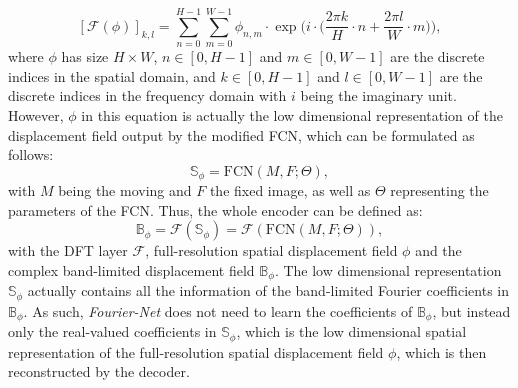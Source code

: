 \begin{equation} \label{eq:DFT}
	[\mathcal{F}(\phi)]_{k,l} = \sum^{H-1}_{n=0} \sum^{W-1}_{m=0} \phi_{n,m} \cdot \exp \Bigg(i \cdot \bigg(\frac{2 \pi k}{H} \cdot n + \frac{2 \pi l}{W} \cdot m \bigg) \Big),
\end{equation}
where $\phi$ has size $H \times W$, $n \in [0,H-1]$ and $m \in [0,W-1]$ are the discrete indices in the spatial domain, and $k \in [0,H-1]$ and $l \in [0,W-1]$ are the discrete indices in the frequency domain with $i$ being the imaginary unit. However, $\phi$ in this equation is actually the low dimensional representation of the displacement field output by the modified FCN, which can be formulated as follows:
\begin{equation} \label{eq:FCN}
	\mathbb{S}_\phi = \text{FCN}(M,F;\Theta),
\end{equation}
with $M$ being the moving and $F$ the fixed image, as well as $\Theta$ representing the parameters of the FCN. Thus, the whole encoder can be defined 
as:
\begin{equation}\label{eq:encoder}
	\mathbb{B}_\phi = \mathcal{F}(\mathbb{S}_\phi) = \mathcal{F}(\text{FCN}(M,F;\Theta)),
\end{equation}
with the DFT layer $\mathcal{F}$, full-resolution spatial displacement field $\phi$ and the complex band-limited displacement field $\mathbb{B}_\phi$. The low dimensional representation $\mathbb{S}_\phi$ actually contains all the information of the band-limited Fourier coefficients in $\mathbb{B}_\phi$. As such, \emph{Fourier-Net} does not need to learn the coefficients of $\mathbb{B}_\phi$, but instead only the real-valued coefficients in $\mathbb{S}_\phi$, which is the low dimensional spatial representation of the full-resolution spatial displacement field $\phi$, which is then reconstructed by the decoder. 


